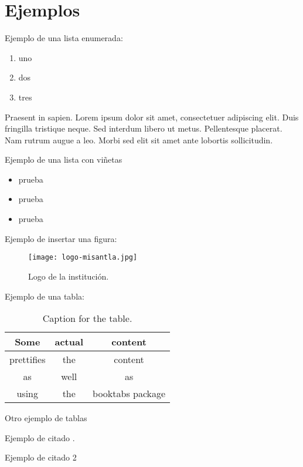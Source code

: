 \chapter{Ejemplos}

Ejemplo de una lista enumerada:

\begin{enumerate}
	\item uno
	\item dos
	\item tres
\end{enumerate}

Praesent in sapien. Lorem ipsum dolor sit amet, consectetuer adipiscing 
elit. Duis fringilla tristique neque. Sed interdum libero ut metus. 
Pellentesque placerat. Nam rutrum augue a leo. Morbi sed elit sit amet 
ante lobortis sollicitudin.

Ejemplo de una lista con viñetas

\begin{itemize}
	\item prueba 
	\item prueba 
	\item prueba
\end{itemize}

Ejemplo de insertar una figura:
\begin{figure}[!ht]
	\caption{Logo de la institución.}
	\centering
	\texttt{[image: logo-misantla.jpg]}
\end{figure}

Ejemplo de una tabla:

\begin{table}[h!]
	\centering
	\caption{Caption for the table.}
	\label{tab:table1}
	\begin{tabular}{ccc}
		\toprule
		Some & actual & content\\
		\midrule
		prettifies & the & content\\
		as & well & as\\
		using & the & booktabs package\\
		\bottomrule
	\end{tabular}
\end{table}

Otro ejemplo de tablas



Ejemplo de citado \cite{Vickrey1961}.

Ejemplo de citado 2 

